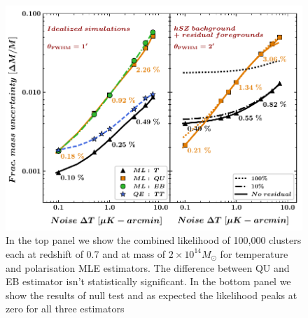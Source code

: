  \begin{figure}
\includegraphics[width=\linewidth, keepaspectratio]{figs/fig1-eps-converted-to.pdf}
 \caption{In the top panel we show the combined likelihood of 100,000 clusters each at redshift of 0.7 and at mass of $2\times 10^{14} M_{\odot}$ for temperature and polarisation MLE estimators. The difference between QU and EB estimator isn't statistically significant. In the bottom panel we show the results of null test and as expected the likelihood peaks at zero for all three estimators}
 \end{figure}
   